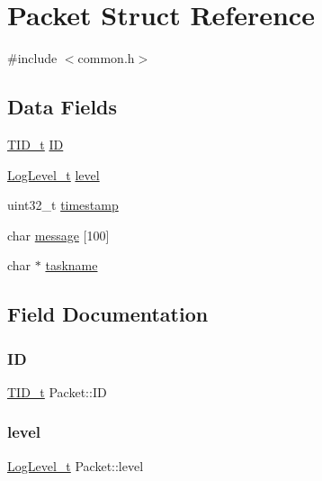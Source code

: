 \hypertarget{struct_packet}{}\section{Packet Struct Reference}
\label{struct_packet}


{\ttfamily \#include $<$common.\+h$>$}

\subsection*{Data Fields}
\begin{DoxyCompactItemize}
\item 
\mbox{\hyperlink{common_8h_a653ab69f9b23c1469af27af82d7ee4eb}{T\+I\+D\+\_\+t}} \mbox{\hyperlink{struct_packet_a06291717345ce92b034ab547888ebb60}{ID}}
\item 
\mbox{\hyperlink{common_8h_a2ecddb2fd9540f571b3c439d77e2f48b}{Log\+Level\+\_\+t}} \mbox{\hyperlink{struct_packet_a72872727b91d6477571f5cf3184be9b6}{level}}
\item 
uint32\+\_\+t \mbox{\hyperlink{struct_packet_af4cbc14232456ae442fd92dfda772586}{timestamp}}
\item 
char \mbox{\hyperlink{struct_packet_a3a243b3013e1a3da4c5a88ec666f6b17}{message}} \mbox{[}100\mbox{]}
\item 
char $\ast$ \mbox{\hyperlink{struct_packet_ad7176ab16a5711801c7d89a56c5bb216}{taskname}}
\end{DoxyCompactItemize}


\subsection{Field Documentation}
\mbox{\label{struct_packet_a06291717345ce92b034ab547888ebb60}} 
\subsubsection{\texorpdfstring{ID}{ID}}
{\footnotesize\ttfamily \mbox{\hyperlink{common_8h_a653ab69f9b23c1469af27af82d7ee4eb}{T\+I\+D\+\_\+t}} Packet\+::\+ID}

\mbox{\label{struct_packet_a72872727b91d6477571f5cf3184be9b6}} 
\subsubsection{\texorpdfstring{level}{level}}
{\footnotesize\ttfamily \mbox{\hyperlink{common_8h_a2ecddb2fd9540f571b3c439d77e2f48b}{Log\+Level\+\_\+t}} Packet\+::level}

